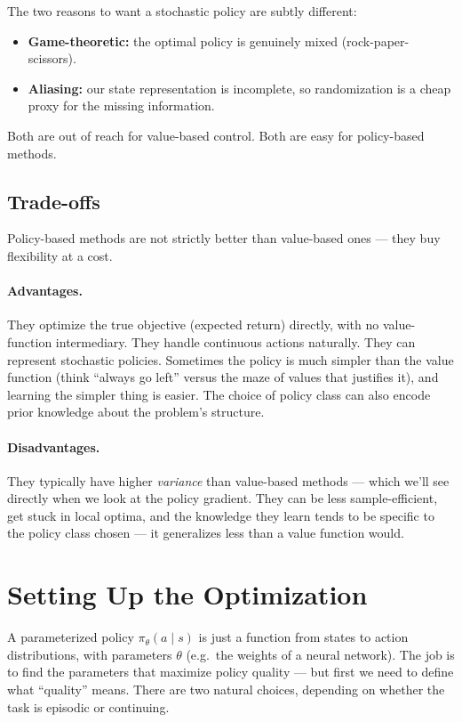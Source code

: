 \documentclass[11pt, oneside]{book}
\begin{document}
\begin{intbox}
The two reasons to want a stochastic policy are subtly different:
\begin{itemize}
  \item \textbf{Game-theoretic:} the optimal policy is genuinely mixed (rock-paper-scissors).
  \item \textbf{Aliasing:} our state representation is incomplete, so randomization is
    a cheap proxy for the missing information.
\end{itemize}
Both are out of reach for value-based control. Both are easy for policy-based methods.
\end{intbox}

\subsection{Trade-offs}

Policy-based methods are not strictly better than value-based ones --- they buy
flexibility at a cost.

\paragraph{Advantages.}
They optimize the true objective (expected return) directly, with no value-function
intermediary.
They handle continuous actions naturally.
They can represent stochastic policies.
Sometimes the policy is much simpler than the value function (think ``always go left''
versus the maze of values that justifies it), and learning the simpler thing is
easier.
The choice of policy class can also encode prior knowledge about the problem's structure.

\paragraph{Disadvantages.}
They typically have higher \emph{variance} than value-based methods --- which we'll
see directly when we look at the policy gradient.
They can be less sample-efficient, get stuck in local optima, and the knowledge they
learn tends to be specific to the policy class chosen --- it generalizes less than a
value function would.

\section{Setting Up the Optimization}

A parameterized policy $\pi_\theta(a \mid s)$ is just a function from states to action
distributions, with parameters $\theta$ (e.g.\ the weights of a neural network).
The job is to find the parameters that maximize policy quality --- but first we need
to define what ``quality'' means.
There are two natural choices, depending on whether the task is episodic or continuing.
\end{document}
